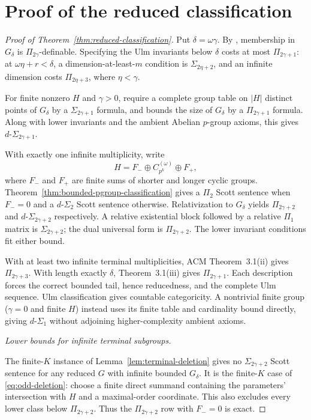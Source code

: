 \documentclass[11pt]{article}
\begin{document}
\section{Proof of the reduced classification}
\begin{proof}[Proof of Theorem~\ref{thm:reduced-classification}]
Put $\delta=\omega\gamma$. By \cite[Proposition~2.2]{ACM}, membership in $G_\delta$ is $\Pi_{2\gamma}$-definable. Specifying the
Ulm invariants below $\delta$ costs at most $\Pi_{2\gamma+1}$:
at $\omega\eta+r<\delta$, a dimension-at-least-$m$ condition is
$\Sigma_{2\eta+2}$, and an infinite dimension costs
$\Pi_{2\eta+3}$, where $\eta<\gamma$.

For finite nonzero $H$ and $\gamma>0$, require a
complete group table on $|H|$ distinct points of $G_\delta$ by a
$\Sigma_{2\gamma+1}$ formula, and bounds the size of $G_\delta$ by a
$\Pi_{2\gamma+1}$ formula. Along with lower invariants and the ambient
Abelian $p$-group axioms, this gives $d\text{-}\Sigma_{2\gamma+1}$.

With exactly one infinite multiplicity, write
\[
                       H=F_-\oplus C_{p^k}^{(\omega)}\oplus F_+,
\]
where $F_-$ and $F_+$ are finite sums of shorter and longer cyclic
groups. Theorem~\ref{thm:bounded-pgroup-classification} gives a $\Pi_2$ Scott sentence when $F_-=0$
and a $d\text{-}\Sigma_2$ Scott sentence otherwise. Relativization to
$G_\delta$ yields $\Pi_{2\gamma+2}$ and
$d\text{-}\Sigma_{2\gamma+2}$ respectively. A relative existential
block followed by a relative $\Pi_1$ matrix is
$\Sigma_{2\gamma+2}$; the dual universal form is
$\Pi_{2\gamma+2}$. The lower invariant conditions fit either bound.

With at least two infinite terminal multiplicities, ACM
Theorem~3.1(ii) gives $\Pi_{2\gamma+3}$. With length exactly $\delta$,
Theorem~3.1(iii) gives $\Pi_{2\gamma+1}$. Each description forces the
correct bounded tail, hence reducedness, and the complete Ulm
sequence. Ulm classification gives countable categoricity.
A nontrivial finite group ($\gamma=0$ and finite $H$) instead uses its
finite table and cardinality bound directly, giving
$d\text{-}\Sigma_1$ without adjoining higher-complexity ambient axioms.

\medskip\noindent\emph{Lower bounds for infinite terminal subgroups.}

The finite-$K$ instance of Lemma~\ref{lem:terminal-deletion} gives no
$\Sigma_{2\gamma+2}$ Scott sentence for any reduced $G$ with infinite
bounded $G_\delta$. It is the finite-$K$ case of
\eqref{eq:odd-deletion}: choose a finite direct summand containing
the parameters' intersection with $H$ and a maximal-order coordinate.
This also excludes every lower class below $\Pi_{2\gamma+2}$.
Thus the $\Pi_{2\gamma+2}$ row with $F_-=0$ is exact.


\end{proof}
\end{document}
